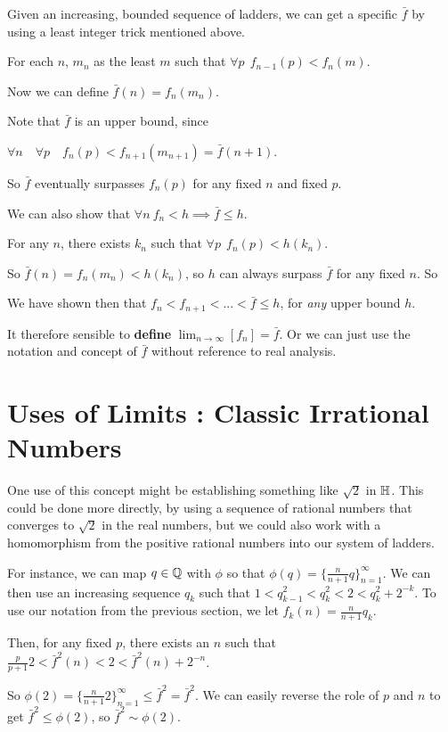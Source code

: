 \documentclass{article}
\renewcommand{\i}{\textit}
\renewcommand{\b}{\textbf}
\renewcommand{\H}{\Bbb H}
\renewcommand{\l}[1]{ #1  }
\begin{document}
Given an increasing, bounded sequence of ladders, we can get a specific $\l{\bar f}$ by using a least integer trick mentioned above. 

For each $n$,  $m_n$ as the least $m$ such that $\forall p \ \ f_{n-1}(p) < f_n(m)$. 

Now we can define $\bar f(n) = f_n(m_n)$. 

Note that $\l{\bar f}$ is an upper bound, since 

$\forall n \quad \forall p \quad f_n(p) < f_{n+1}(m_{n+1}) = \bar f(n+1)$.

So $\bar f$ eventually surpasses $f_n(p)$ for any fixed $n$ and fixed $p$.

We can also show that $\forall n \ \l{f_n} < \l{h} \implies \l{\bar f} \le \l{h}$.

For any $n$, there exists $k_n$ such that $\forall p \ \ f_n(p) < h(k_n)$. 

So $ \bar f(n) = f_n(m_n) < h(k_n)$, so $h$ can always surpass $\bar f$ for any fixed $n$.  So 

We have shown then that $\l{f_n}  < \l{f_{n+1}}  <  ... < \l{\bar f} \le \l{h}$, for \i{any} upper bound $\l{h}$.   


It therefore sensible to \b{define} $\lim_{n \to \infty} [ \l{f_n} ]  =  \l{\bar f}$. Or we can just use the notation and concept of $\l{\bar f}$ without reference to real analysis. 

\section{Uses of Limits : Classic Irrational Numbers}
One use of this concept might be establishing something like $\sqrt{2}$ in $\H$. This could be done more directly, by using a sequence of rational numbers that converges to $\sqrt{2}$ in the real numbers, but we could also work with a homomorphism from the positive rational numbers into our system of ladders. 

For instance, we can map $q \in \Bbb Q$ with $\phi$ so that $\phi(q) = \{\frac{n}{n+1}q\}_{n=1}^{\infty}$. We can then use an increasing sequence $q_k$ such that $1 < q_{k-1}^2 < q_k^2 < 2 < q_k^2 + 2^{-k}$. To use our notation from the previous section, we let $f_k(n) = \frac{n}{n+1}q_k$. 

Then, for any fixed $p$, there exists an $n$ such that $\frac{p}{p+1}2 < \bar f ^ 2 (n) < 2 < \bar f ^ 2 (n) + 2^{-n}$. 

So $\phi(2) = \{\frac{n}{n+1}2\}_{n=1}^{\infty} \le \l{\bar f}^2 = \l{\bar f ^2}.$ We can easily reverse the role of $p$ and $n$ to get $\l{\bar f}^2 \le \phi(2)$, so  $\l{\bar f}^2 \sim \phi(2)$.
\end{document}
